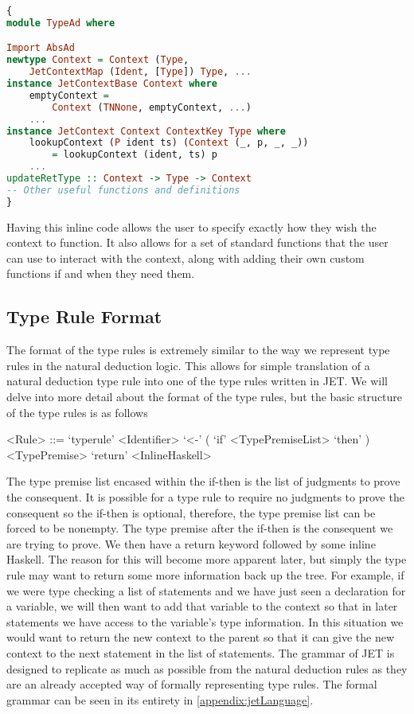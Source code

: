 \begin{lstlisting}[caption = Example of initial inline haskell code, label=lst:inlineHaskellCode, language=Haskell]
{
module TypeAd where

Import AbsAd
newtype Context = Context (Type, 
    JetContextMap (Ident, [Type]) Type, ...
instance JetContextBase Context where
    emptyContext = 
        Context (TNNone, emptyContext, ...)
    ...
instance JetContext Context ContextKey Type where
    lookupContext (P ident ts) (Context (_, p, _, _)) 
        = lookupContext (ident, ts) p
    ...
updateRetType :: Context -> Type -> Context
-- Other useful functions and definitions
}
\end{lstlisting}

Having this inline code allows the user to specify exactly how they wish the context to function.
It also allows for a set of standard functions that the user can use to interact with the context, along with adding their own custom functions if and when they need them.

\subsection{Type Rule Format}

The format of the type rules is extremely similar to the way we represent type rules in the natural deduction logic.
This allows for simple translation of a natural deduction type rule into one of the type rules written in JET.
We will delve into more detail about the format of the type rules, but the basic structure of the type rules is as follows

\begin{grammar}
    <Rule> ::= `typerule' <Identifier> `<-' ( `if' <TypePremiseList> `then' ) <TypePremise> `return' <InlineHaskell>
\end{grammar}

The type premise list encased within the if-then is the list of judgments to prove the consequent.
It is possible for a type rule to require no judgments to prove the consequent so the if-then is optional, therefore, the type premise list can be forced to be nonempty.
The type premise after the if-then is the consequent we are trying to prove.
We then have a return keyword followed by some inline Haskell.
The reason for this will become more apparent later, but simply the type rule may want to return some more information back up the tree.
For example, if we were type checking a list of statements and we have just seen a declaration for a variable, we will then want to add that variable to the context so that in later statements we have access to the variable's type information.
In this situation we would want to return the new context to the parent so that it can give the new context to the next statement in the list of statements.
The grammar of JET is designed to replicate as much as possible from the natural deduction rules as they are an already accepted way of formally representing type rules.
The formal grammar can be seen in its entirety in \autoref{appendix:jetLanguage}.